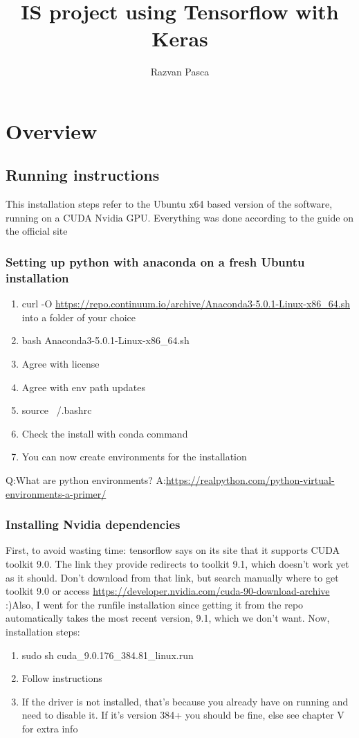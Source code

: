 \documentclass[a4paper,11pt]{article}
\title{IS project using Tensorflow with Keras}
\author{Razvan Pasca}
\begin{document}
\maketitle



\tableofcontents
\newpage
\section{Overview}
 
 \subsection{Running instructions}
 This installation steps refer to the Ubuntu x64 based version of the
 software, running on a CUDA Nvidia GPU. Everything was done according
 to the guide on the official site \cite{tensorflowSite}
   \subsubsection{Setting up python with anaconda on a fresh Ubuntu installation}
   \begin{enumerate}
   	\item curl -O \url {https://repo.continuum.io/archive/Anaconda3-5.0.1-Linux-x86_64.sh}	into a folder of your choice
   	\item bash Anaconda3-5.0.1-Linux-x86_64.sh
	\item Agree with license
   	\item Agree with env path updates
   	\item source ~/.bashrc
   	\item Check the install with conda command
	\item You can now create environments for the installation
   \end{enumerate}
   Q:What are python environments?\newline
   A:\url{https://realpython.com/python-virtual-environments-a-primer/}
	 
	\subsubsection{Installing Nvidia dependencies}
	First, to avoid wasting time: tensorflow says on its site that it
	supports CUDA toolkit 9.0. The link they provide redirects to toolkit
	9.1, which doesn’t work yet as it should. Don’t download from that
	link, but search manually where to get toolkit 9.0 or access
	 \url{https://developer.nvidia.com/cuda-90-download-archive}​ :)Also, I went for the runfile installation since getting it from the repo
	automatically takes the most recent version, 9.1, which we don’t want.
	Now, installation steps:
	\begin{enumerate}
		\item  sudo sh cuda_9.0.176_384.81_linux.run
		\item Follow instructions
		\item If the driver is not installed, that’s because you already have on
		running and need to disable it. If it’s version 384+ you should be fine,
		else see chapter V for extra info
	\end{enumerate}
\end{document}
